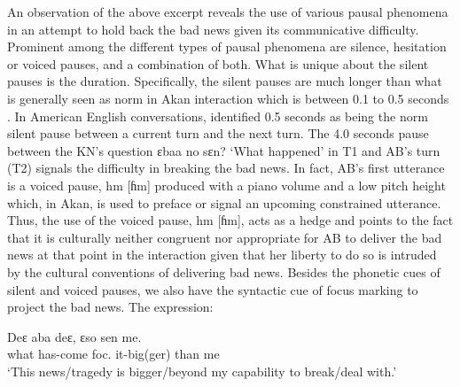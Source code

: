 \documentclass[output=paper,colorlinks,citecolor=brown]{langscibook}
\begin{document}
An observation of the above excerpt reveals the use of various pausal phenomena in an attempt to hold back the bad news given its communicative difficulty. Prominent among the different types of pausal phenomena are silence, hesitation or voiced pauses, and a combination of both. What is unique about the silent pauses is the duration. Specifically, the silent pauses are much longer than what is generally seen as norm in Akan interaction which is between 0.1 to 0.5 seconds \citep{Obeng1987, Obeng1989, Obeng1999} . In American English conversations, \citet{Jefferson1983} identified 0.5 seconds as being the norm silent pause between a current turn and the next turn. The 4.0 seconds pause between the KN’s question ɛbaa no sɛn? ‘What happened’ in T1 and AB’s turn (T2) signals the difficulty in breaking the bad news. In fact, AB’s first utterance is a voiced pause, hm [ɦm] produced with a piano volume and a low pitch height which, in Akan, is used to preface or signal an upcoming constrained utterance. Thus, the use of the voiced pause, hm [ɦm], acts as a hedge and points to the fact that it is culturally neither congruent nor appropriate for AB to deliver the bad news at that point in the interaction given that her liberty to do so is intruded by the cultural conventions of delivering bad news. Besides the phonetic cues of silent and voiced pauses, we also have the syntactic cue of focus marking to project the bad news. The expression:

\ea
    \gll    Deɛ aba deɛ, ɛso sen me.\\
            what has-come foc. it-big(ger) than me\\
    \glt    `This news/tragedy is bigger/beyond my capability to break/deal with.'
\z
\end{document}
